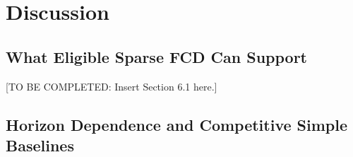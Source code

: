 \documentclass[pdflatex,sn-mathphys-num,iicol]{sn-jnl}
\begin{document}
%


%

%

\section{Discussion}\label{sec:discussion}

\subsection{What Eligible Sparse FCD Can Support}\label{subsec:eligible-fcd}

[TO BE COMPLETED: Insert Section 6.1 here.]

\subsection{Horizon Dependence and Competitive Simple Baselines}\label{subsec:horizon}
\end{document}
